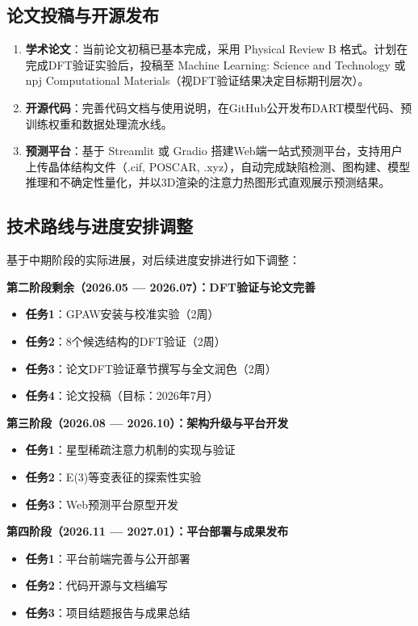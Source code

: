 \subsection{论文投稿与开源发布}

\begin{enumerate}
    \item \textbf{学术论文}：当前论文初稿已基本完成，采用 Physical Review B 格式。计划在完成DFT验证实验后，投稿至 Machine Learning: Science and Technology 或 npj Computational Materials（视DFT验证结果决定目标期刊层次）。

    \item \textbf{开源代码}：完善代码文档与使用说明，在GitHub公开发布DART模型代码、预训练权重和数据处理流水线。

    \item \textbf{预测平台}：基于 Streamlit 或 Gradio 搭建Web端一站式预测平台，支持用户上传晶体结构文件（.cif, POSCAR, .xyz），自动完成缺陷检测、图构建、模型推理和不确定性量化，并以3D渲染的注意力热图形式直观展示预测结果。
\end{enumerate}

\subsection{技术路线与进度安排调整}

基于中期阶段的实际进展，对后续进度安排进行如下调整：

\textbf{第二阶段剩余（2026.05 — 2026.07）：DFT验证与论文完善}
\begin{itemize}
    \item \textbf{任务1}：GPAW安装与校准实验（2周）
    \item \textbf{任务2}：8个候选结构的DFT验证（2周）
    \item \textbf{任务3}：论文DFT验证章节撰写与全文润色（2周）
    \item \textbf{任务4}：论文投稿（目标：2026年7月）
\end{itemize}

\textbf{第三阶段（2026.08 — 2026.10）：架构升级与平台开发}
\begin{itemize}
    \item \textbf{任务1}：星型稀疏注意力机制的实现与验证
    \item \textbf{任务2}：E(3)等变表征的探索性实验
    \item \textbf{任务3}：Web预测平台原型开发
\end{itemize}

\textbf{第四阶段（2026.11 — 2027.01）：平台部署与成果发布}
\begin{itemize}
    \item \textbf{任务1}：平台前端完善与公开部署
    \item \textbf{任务2}：代码开源与文档编写
    \item \textbf{任务3}：项目结题报告与成果总结
\end{itemize}


